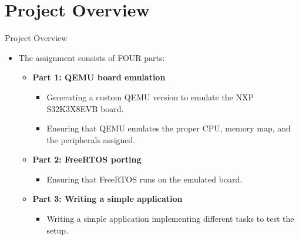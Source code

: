
\section{Project Overview}

\begin{frame}{Project Overview}
    \begin{itemize}
        \item The assignment consists of FOUR parts:
            \begin{itemize}
                \item \textbf{Part 1: QEMU board emulation}
                    \begin{itemize}
                        \item Generating a custom QEMU version to emulate the NXP S32K3X8EVB board.
                        \item Ensuring that QEMU emulates the proper CPU, memory map, and the peripherals assigned.
                    \end{itemize}
                \item \textbf{Part 2: FreeRTOS porting}
                    \begin{itemize}
                        \item Ensuring that FreeRTOS runs on the emulated board.
                    \end{itemize}
                \item \textbf{Part 3: Writing a simple application}
                    \begin{itemize}
                        \item Writing a simple application implementing different tasks to test the setup.
                    \end{itemize}
            \end{itemize}
    \end{itemize}
\end{frame}

